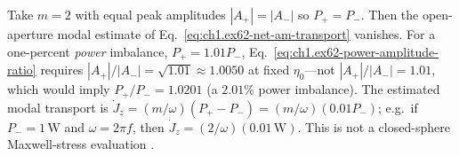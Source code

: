 \begin{example}
\label{ex:ch1.counter-rotating-numeric}
Take $m=2$ with equal peak amplitudes $|A_+|=|A_-|$ so $P_+=P_-$. Then the open-aperture modal estimate of Eq.~\eqref{eq:ch1.ex62-net-am-transport} vanishes. For a one-percent \emph{power} imbalance, $P_+=1.01P_-$, Eq.~\eqref{eq:ch1.ex62-power-amplitude-ratio} requires $|A_+|/|A_-|=\sqrt{1.01}\approx 1.0050$ at fixed $\eta_0$---not $|A_+|/|A_-|=1.01$, which would imply $P_+/P_-=1.0201$ (a $2.01\%$ power imbalance). The estimated modal transport is $\dot J_z=(m/\omega)(P_+-P_-)=(m/\omega)(0.01P_-)$; e.g.\ if $P_-=1\,\mathrm{W}$ and $\omega=2\pi f$, then $\dot J_z=(2/\omega)(0.01\,\mathrm{W})$. This is not a closed-sphere Maxwell-stress evaluation \cite{allen1992}.
\end{example}

